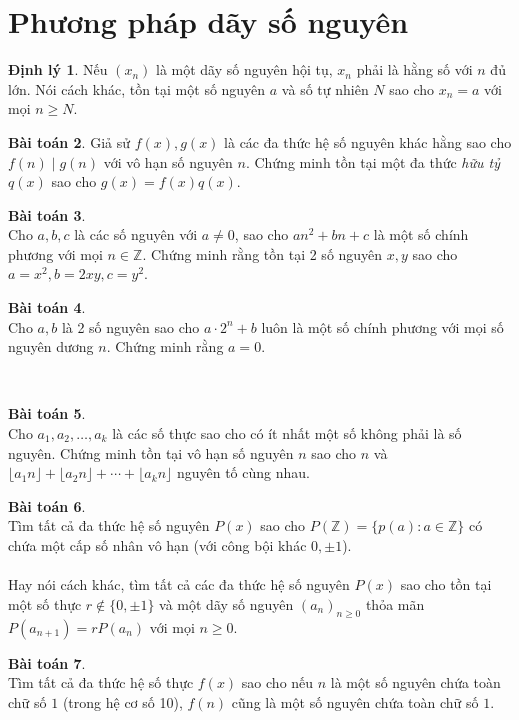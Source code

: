 \documentclass{article}
\theoremstyle{definition}
\newtheorem{theorem}{Định lý}[section]
\newtheorem{exercise}[theorem]{Bài toán}
\begin{document}
\section{Phương pháp dãy số nguyên}
\begin{theorem} \label{int-conv-seq}
Nếu $(x_n)$ là một dãy số nguyên hội tụ, $x_n$ phải là hằng số với $n$ đủ lớn. Nói cách khác, tồn tại một số nguyên $a$ và số tự nhiên $N$ sao cho $x_n = a$ với mọi $n \geq N$.
\end{theorem}
\begin{exercise}
Giả sử $f(x), g(x)$ là các đa thức hệ số nguyên khác hằng sao cho $f(n) \mid g(n)$ với vô hạn số nguyên $n$. Chứng minh tồn tại một đa thức \textit{hữu tỷ} $q(x)$ sao cho $g(x) = f(x) q(x)$.
\end{exercise}
\begin{exercise} \ \\
Cho $a, b, c$ là các số nguyên với $a \neq 0$, sao cho $an^2 + bn + c$ là một số chính phương với mọi $n \in \mathbb{Z}$. Chứng minh rằng tồn tại 2 số nguyên $x, y$ sao cho $a = x^2, b = 2xy, c = y^2$.
\end{exercise}
\begin{exercise} \ \\
Cho $a, b$ là 2 số nguyên sao cho $a \cdot 2^n + b$ luôn là một số chính phương với mọi số nguyên dương $n$. Chứng minh rằng $a = 0$.
\end{exercise}
\ \\
\begin{exercise} \ \\
Cho $a_1, a_2, \hdots, a_k$ là các số thực sao cho có ít nhất một số không phải là số nguyên. Chứng minh tồn tại vô hạn số nguyên $n$ sao cho $n$ và $\lfloor a_1 n \rfloor + \lfloor a_2 n \rfloor + \cdots + \lfloor a_k n \rfloor$ nguyên tố cùng nhau.
\end{exercise}
\begin{exercise} \ \\
Tìm tất cả đa thức hệ số nguyên $P(x)$ sao cho $P(\mathbb{Z}) = \{ p(a) : a \in \mathbb{Z} \}$ có chứa một cấp số nhân vô hạn (với công bội khác $0, \pm 1$).
\\
\\
Hay nói cách khác, tìm tất cả các đa thức hệ số nguyên $P(x)$ sao cho tồn tại một số thực $r \notin \{ 0, \pm 1 \}$ và một dãy số nguyên $(a_n)_{n \geq 0}$ thỏa mãn $P(a_{n + 1}) = r P(a_n)$ với mọi $n \geq 0$.
\end{exercise}
\begin{exercise} \ \\
Tìm tất cả đa thức hệ số thực $f(x)$ sao cho nếu $n$ là một số nguyên chứa toàn chữ số $1$ (trong hệ cơ số 10), $f(n)$ cũng là một số nguyên chứa toàn chữ số $1$.
\end{exercise}
\end{document}
